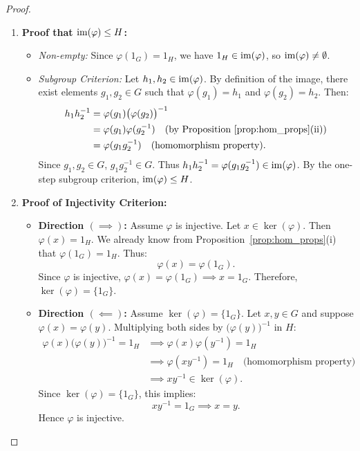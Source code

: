 \begin{proof}
\begin{enumerate}[label=\textbf{(\roman*)}, leftmargin=*, itemsep=8pt]
    \item \textbf{Proof that $\operatorname{im}(\varphi) \le H$:}
    \begin{itemize}[leftmargin=1.5em, itemsep=4pt]
        \item \emph{Non-empty:} Since $\varphi(1_G) = 1_H$, we have $1_H \in \operatorname{im}(\varphi)$, so $\operatorname{im}(\varphi) \ne \emptyset$.
        \item \emph{Subgroup Criterion:} Let $h_1, h_2 \in \operatorname{im}(\varphi)$. By definition of the image, there exist elements $g_1, g_2 \in G$ such that $\varphi(g_1) = h_1$ and $\varphi(g_2) = h_2$. Then:
        \begin{align*}
        h_1 h_2^{-1} &= \varphi(g_1)\bigl(\varphi(g_2)\bigr)^{-1} \\
        &= \varphi(g_1)\varphi(g_2^{-1}) \quad \text{(by Proposition~\ref{prop:hom_props}(ii))} \\
        &= \varphi(g_1 g_2^{-1}) \quad \text{(homomorphism property)}.
        \end{align*}
        Since $g_1, g_2 \in G$, $g_1 g_2^{-1} \in G$. Thus $h_1 h_2^{-1} = \varphi(g_1 g_2^{-1}) \in \operatorname{im}(\varphi)$.
        By the one-step subgroup criterion, $\operatorname{im}(\varphi) \le H$.
    \end{itemize}

    \item \textbf{Proof of Injectivity Criterion:}
    \begin{itemize}[leftmargin=1.5em, itemsep=4pt]
        \item \textbf{Direction $(\implies)$:} Assume $\varphi$ is injective. Let $x \in \ker(\varphi)$.
        Then $\varphi(x) = 1_H$.
        We already know from Proposition~\ref{prop:hom_props}(i) that $\varphi(1_G) = 1_H$.
        Thus:
        \begin{equation*}
        \varphi(x) = \varphi(1_G).
        \end{equation*}
        Since $\varphi$ is injective, $\varphi(x) = \varphi(1_G) \implies x = 1_G$.
        Therefore, $\ker(\varphi) = \{ 1_G \}$.
        
        \item \textbf{Direction $(\impliedby)$:} Assume $\ker(\varphi) = \{ 1_G \}$. Let $x, y \in G$ and suppose $\varphi(x) = \varphi(y)$.
        Multiplying both sides by $\bigl(\varphi(y)\bigr)^{-1}$ in $H$:
        \begin{align*}
        \varphi(x)\bigl(\varphi(y)\bigr)^{-1} = 1_H 
        &\implies \varphi(x)\varphi(y^{-1}) = 1_H \\
        &\implies \varphi(xy^{-1}) = 1_H \quad \text{(homomorphism property)} \\
        &\implies xy^{-1} \in \ker(\varphi).
        \end{align*}
        Since $\ker(\varphi) = \{ 1_G \}$, this implies:
        \begin{equation*}
        xy^{-1} = 1_G \implies x = y.
        \end{equation*}
        Hence $\varphi$ is injective.
    \end{itemize}
\end{enumerate}
\end{proof}

